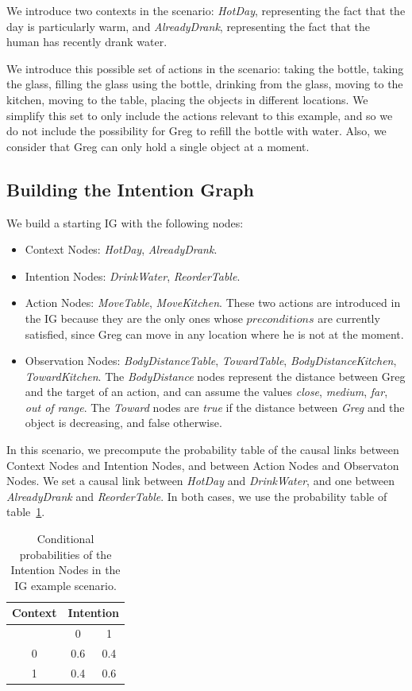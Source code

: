 We introduce two contexts in the scenario: \textit{HotDay}, representing the fact that the day is particularly warm, and \textit{AlreadyDrank}, representing the fact that the human has recently drank water.

We introduce this possible set of actions in the scenario: taking the bottle, taking the glass, filling the glass using the bottle, drinking from the glass, moving to the kitchen, moving to the table, placing the objects in different locations. We simplify this set to only include the actions relevant to this example, and so we do not include the possibility for Greg to refill the bottle with water. Also, we consider that Greg can only hold a single object at a moment. 

\subsection{Building the Intention Graph}
We build a starting IG with the following nodes:
\begin{itemize}
	\item Context Nodes: \textit{HotDay}, \textit{AlreadyDrank}.
	\item Intention Nodes: \textit{DrinkWater}, \textit{ReorderTable}.
	\item Action Nodes: \textit{MoveTable}, \textit{MoveKitchen}. These two actions are introduced in the IG because they are the only ones whose $preconditions$ are currently satisfied, since Greg can move in any location where he is not at the moment.
	\item Observation Nodes: \textit{BodyDistanceTable}, \textit{TowardTable}, \textit{BodyDistanceKitchen}, \textit{TowardKitchen}. The \textit{BodyDistance} nodes represent the distance between Greg and the target of an action, and can assume the values \textit{close}, \textit{medium}, \textit{far}, \textit{out of range}. The \textit{Toward} nodes are \textit{true} if the distance between \textit{Greg} and the object is decreasing, and false otherwise.
\end{itemize}


In this scenario, we precompute the probability table of the causal links between Context Nodes and Intention Nodes, and between Action Nodes and Observaton Nodes. We set a causal link between \textit{HotDay} and \textit{DrinkWater}, and one between \textit{AlreadyDrank} and \textit{ReorderTable}. In both cases, we use the probability table of table~\ref{table:intention-ig_intention}.

 \begin{table}[h!]
\centering
\begin{tabular}{|c|c|c|}
\hline
Context & \multicolumn{2}{|c|}{Intention} \\ \hline \hline
& 0 & 1 \\ \hline
0  & 0.6 & 0.4 \\ \hline
1 & 0.4 & 0.6 \\ \hline
\end{tabular}
\caption{Conditional probabilities of the Intention Nodes in the IG example scenario.}
 \label{table:intention-ig_intention}    
\end{table}

